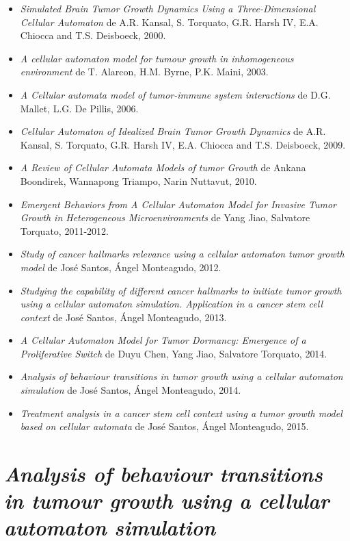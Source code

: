 \begin{itemize}
    \item \textit{Simulated Brain Tumor Growth Dynamics Using a Three-Dimensional Cellular Automaton}
    de A.R. Kansal, S. Torquato, G.R. Harsh IV, E.A. Chiocca and T.S. Deisboeck, 2000.
    \item \textit{A cellular automaton model for tumour growth in inhomogeneous environment}
    de T. Alarcon, H.M. Byrne, P.K. Maini, 2003.
    \item \textit{A Cellular automata model of tumor-immune system interactions}
    de D.G. Mallet, L.G. De Pillis, 2006.
    \item \textit{Cellular Automaton of Idealized Brain Tumor Growth Dynamics}
    de A.R. Kansal, S. Torquato, G.R. Harsh IV, E.A. Chiocca and T.S. Deisboeck, 2009.
    \item \textit{A Review of Cellular Automata Models of tumor Growth}
    de Ankana Boondirek, Wannapong Triampo, Narin Nuttavut, 2010.
    \item \textit{Emergent Behaviors from A Cellular Automaton Model for Invasive Tumor Growth in Heterogeneous Microenvironments}
    de Yang Jiao, Salvatore Torquato, 2011-2012.
    \item \textit{Study of cancer hallmarks relevance using a cellular automaton tumor growth model}
    de José Santos, Ángel Monteagudo, 2012.
    \item \textit{Studying the capability of different cancer hallmarks to initiate tumor growth using a cellular automaton simulation. Application in a cancer stem cell context}
    de José Santos, Ángel Monteagudo, 2013.
    \item \textit{A Cellular Automaton Model for Tumor Dormancy: Emergence of a Proliferative Switch}
    de Duyu Chen, Yang Jiao, Salvatore Torquato, 2014.
    \item \textit{Analysis of behaviour transitions in tumor growth using a cellular automaton simulation}
    de José Santos, Ángel Monteagudo, 2014.
    \item \textit{Treatment analysis in a cancer stem cell context using a tumor growth model based on cellular automata}
    de José Santos, Ángel Monteagudo, 2015.
\end{itemize}

\section{\textit{Analysis of behaviour transitions in tumour growth
using a cellular automaton simulation}}

